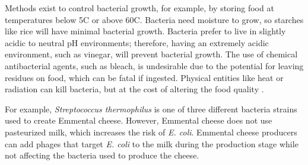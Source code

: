 Methods exist to control bacterial growth, for example, by storing food at temperatures below 5\textdegree C or above 60\textdegree C.
Bacteria need moisture to grow, so starches like rice will have minimal bacterial growth.
Bacteria prefer to live in slightly acidic to neutral pH environments; therefore, having an extremely acidic environment, such as vinegar, will prevent bacterial growth.
The use of chemical antibacterial agents, such as bleach, is undesirable due to the potential for leaving residues on food, which can be fatal if ingested.
Physical entities like heat or radiation can kill bacteria, but at the cost of altering the food quality \cite{fieseler_food_2021}. 

For example, \textit{Streptococcus thermophilus} is one of three different bacteria strains used to create Emmental cheese.
However, Emmental cheese does not use pasteurized milk, which increases the risk of \textit{E. coli}.
Emmental cheese producers can add phages that target \textit{E. coli} to the milk during the production stage while not affecting the bacteria used to produce the cheese. 

